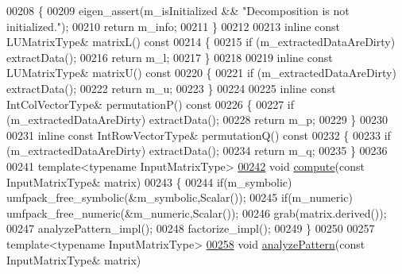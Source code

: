 \begin{DoxyCode}
00208 \textcolor{keyword}{    }\{
00209       eigen\_assert(m\_isInitialized && \textcolor{stringliteral}{"Decomposition is not initialized."});
00210       \textcolor{keywordflow}{return} m\_info;
00211     \}
00212 
00213     \textcolor{keyword}{inline} \textcolor{keyword}{const} LUMatrixType& matrixL()\textcolor{keyword}{ const}
00214 \textcolor{keyword}{    }\{
00215       \textcolor{keywordflow}{if} (m\_extractedDataAreDirty) extractData();
00216       \textcolor{keywordflow}{return} m\_l;
00217     \}
00218 
00219     \textcolor{keyword}{inline} \textcolor{keyword}{const} LUMatrixType& matrixU()\textcolor{keyword}{ const}
00220 \textcolor{keyword}{    }\{
00221       \textcolor{keywordflow}{if} (m\_extractedDataAreDirty) extractData();
00222       \textcolor{keywordflow}{return} m\_u;
00223     \}
00224 
00225     \textcolor{keyword}{inline} \textcolor{keyword}{const} IntColVectorType& permutationP()\textcolor{keyword}{ const}
00226 \textcolor{keyword}{    }\{
00227       \textcolor{keywordflow}{if} (m\_extractedDataAreDirty) extractData();
00228       \textcolor{keywordflow}{return} m\_p;
00229     \}
00230 
00231     \textcolor{keyword}{inline} \textcolor{keyword}{const} IntRowVectorType& permutationQ()\textcolor{keyword}{ const}
00232 \textcolor{keyword}{    }\{
00233       \textcolor{keywordflow}{if} (m\_extractedDataAreDirty) extractData();
00234       \textcolor{keywordflow}{return} m\_q;
00235     \}
00236 
00241     \textcolor{keyword}{template}<\textcolor{keyword}{typename} InputMatrixType>
\hyperlink{class_eigen_1_1_umf_pack_l_u_a05fb2b5717ebd67e46b83439721ceee7}{00242}     \textcolor{keywordtype}{void} \hyperlink{class_eigen_1_1_umf_pack_l_u_a05fb2b5717ebd67e46b83439721ceee7}{compute}(\textcolor{keyword}{const} InputMatrixType& matrix)
00243     \{
00244       \textcolor{keywordflow}{if}(m\_symbolic) umfpack\_free\_symbolic(&m\_symbolic,Scalar());
00245       \textcolor{keywordflow}{if}(m\_numeric)  umfpack\_free\_numeric(&m\_numeric,Scalar());
00246       grab(matrix.derived());
00247       analyzePattern\_impl();
00248       factorize\_impl();
00249     \}
00250 
00257     \textcolor{keyword}{template}<\textcolor{keyword}{typename} InputMatrixType>
\hyperlink{class_eigen_1_1_umf_pack_l_u_ac7ea28b2017d6b26b7b08497f294e5e6}{00258}     \textcolor{keywordtype}{void} \hyperlink{class_eigen_1_1_umf_pack_l_u_ac7ea28b2017d6b26b7b08497f294e5e6}{analyzePattern}(\textcolor{keyword}{const} InputMatrixType& matrix)

\end{DoxyCode}
